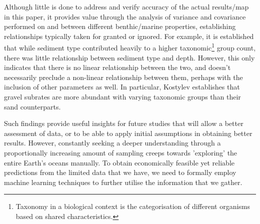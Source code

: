 Although little is done to address and verify accuracy of the actual results/map in this paper, it provides value through the analysis of variance and covariance performed on and between different benthic/marine properties, establishing relationships typically taken for granted or ignored. For example, it is established that while sediment type contributed heavily to a higher taxonomic\footnote{Taxonomy in a biological context is the categorisation of different organisms based on shared characteristics.} group count, there was little relationship between sediment type and depth. However, this only indicates that there is no linear relationship between the two, and doesn't necessarily preclude a non-linear relationship between them, perhaps with the inclusion of other parameters as well. In particular, Kostylev establishes that gravel subrates are more abundant with varying taxonomic groups than their sand counterparts.


Such findings provide useful insights for future studies that will allow a better assessment of data, or to be able to apply initial assumptions in obtaining better results. However, constantly seeking a deeper understanding through a proportionally increasing amount of sampling creeps towards 'exploring' the entire Earth's oceans manually. To obtain economically feasible yet reliable predictions from the limited data that we have, we need to formally employ machine learning techniques to further utilise the information that we gather.

